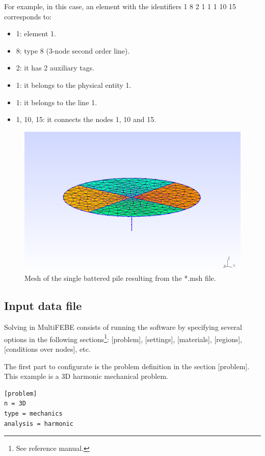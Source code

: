 \documentclass[a4]{article}
\begin{document}
For example, in this case, an element with the identifiers 1 8 2 1 1 1 10 15 corresponds to:

\begin{itemize}
	\item 1: element 1.
	\item 8: type 8 (3-node second order line).
	\item 2: it has 2 auxiliary tags.
	\item 1: it belongs to the physical entity 1.
	\item 1: it belongs to the line 1.
	\item 1, 10, 15: it connects the nodes 1, 10 and 15.
\end{itemize} 

\begin{figure}[h]
	\centering
	\includegraphics[scale = 0.58]{mesh.png}
	\caption{Mesh of the single battered pile resulting from the *.msh file.}
	\label{fig:mesh}
\end{figure}

\subsection{Input data file}
Solving in MultiFEBE consists of running the software by specifying several options in the following sections\footnote{See reference manual.}: [problem], [settings], [materials], [regions], [conditions over nodes], etc.

The first part to configurate is the problem definition in the section [problem]. This example is a 3D harmonic mechanical problem.

\begin{Verbatim}	
[problem]
n = 3D
type = mechanics
analysis = harmonic
\end{Verbatim}
\end{document}
